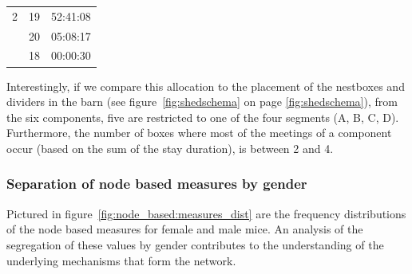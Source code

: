 \begin{table}
\begin{center}
\begin{tabular}{lll}
2	& 19	& 52:41:08 \\
	& 20	& 05:08:17 \\
	& 18	& 00:00:30 \\\hline

\end{tabular}
\label{tab:comp_box_meet_dist}
\end{center}
\end{table} 

Interestingly, if we compare this allocation to the placement of the nestboxes and dividers in the barn (see figure~\ref{fig:shedschema} on page \ref{fig:shedschema}), from the six components, five are restricted to one of the four segments (A, B, C, D). Furthermore, the number of boxes where most of the meetings of a component occur (based on the sum of the stay duration), is between 2 and 4. 
 
\subsubsection{Separation of node based measures by gender}
\label{subsubsec:nbm_dist}

Pictured in figure~\ref{fig:node_based:measures_dist} are the frequency distributions of the node based measures for female and male mice. An analysis of the segregation of these values by gender contributes to the understanding of the underlying mechanisms that form the network.


